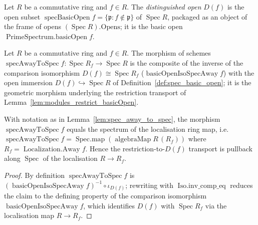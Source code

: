 \begin{definition}
  \label{def:spec_basic_open}
  Let \(R\) be a commutative ring and \(f \in R\). The \emph{distinguished open}
  \(D(f)\) is the open subset \(\operatorname{specBasicOpen} f = \{\mathfrak{p} : f \notin
  \mathfrak{p}\}\) of \(\operatorname{Spec} R\), packaged as an object of the frame of opens
  \((\operatorname{Spec} R).\mathrm{Opens}\); it is the basic open \(\operatorname{PrimeSpectrum.basicOpen} f\).
\end{definition}

\begin{lemma}
  \label{lem:spec_away_to_spec}
  Let \(R\) be a commutative ring and \(f \in R\). The morphism of schemes
  \(\operatorname{specAwayToSpec} f : \operatorname{Spec} R_f \to \operatorname{Spec} R\) is the
  composite of the inverse of the comparison isomorphism \(D(f) \cong \operatorname{Spec} R_f\)
  (\(\operatorname{basicOpenIsoSpecAway} f\)) with the open immersion
  \(D(f) \hookrightarrow \operatorname{Spec} R\) of Definition~\ref{def:spec_basic_open}; it is the
  geometric morphism underlying the restriction transport of
  Lemma~\ref{lem:modules_restrict_basicOpen}.
\end{lemma}

\begin{lemma}
  \label{lem:spec_away_to_spec_eq}
  With notation as in Lemma~\ref{lem:spec_away_to_spec}, the morphism
  \(\operatorname{specAwayToSpec} f\) equals the spectrum of the localisation ring map, i.e.\
  \(\operatorname{specAwayToSpec} f = \operatorname{Spec.map}(\operatorname{algebraMap} R\,(R_f))\)
  where \(R_f = \operatorname{Localization.Away} f\). Hence the restriction-to-\(D(f)\) transport is
  pullback along \(\operatorname{Spec}\) of the localisation \(R \to R_f\).
\end{lemma}
\begin{proof}
  \leanok
  By definition \(\operatorname{specAwayToSpec} f\) is
  \((\operatorname{basicOpenIsoSpecAway} f)^{-1} \circ \iota_{D(f)}\); rewriting with
  \(\operatorname{Iso.inv\_comp\_eq}\) reduces the claim to the defining property of the comparison
  isomorphism \(\operatorname{basicOpenIsoSpecAway} f\), which identifies \(D(f)\) with
  \(\operatorname{Spec} R_f\) via the localisation map \(R \to R_f\).
\end{proof}

